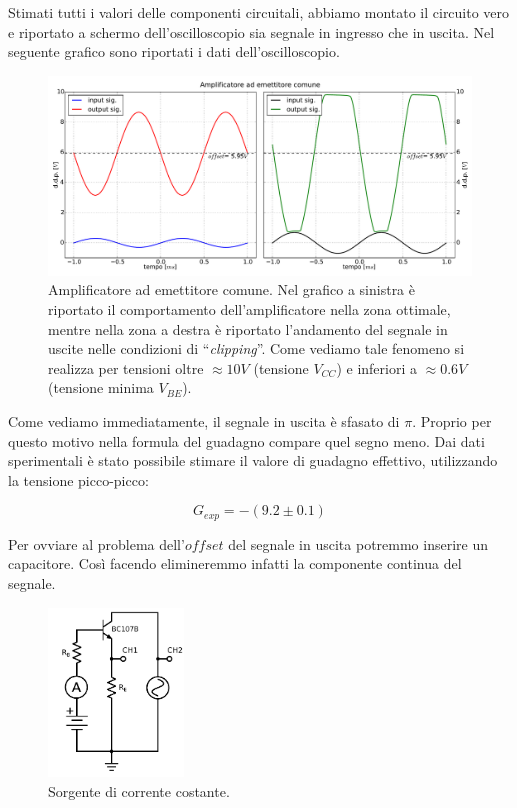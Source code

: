 Stimati tutti i valori delle componenti circuitali, abbiamo montato il circuito vero e riportato a schermo dell'oscilloscopio sia segnale in ingresso che in uscita.
Nel seguente grafico sono riportati i dati dell'oscilloscopio.

\begin{figure}[H]
\centering
	\includegraphics[scale=0.45]{amp.pdf}
	\caption{Amplificatore ad emettitore comune. Nel grafico a sinistra è riportato il comportamento dell'amplificatore nella zona ottimale, mentre nella zona a destra è riportato l'andamento del segnale in uscite nelle condizioni di ``\emph{clipping}''. Come vediamo tale fenomeno si realizza per tensioni oltre $\approx 10V$ (tensione $V_{CC}$) e inferiori a $\approx 0.6V$ (tensione minima $V_{BE}$). }
	\label{fig:amp}
\end{figure}

Come vediamo immediatamente, il segnale in uscita è sfasato di $\pi$.
Proprio per questo motivo nella formula del guadagno compare quel segno meno.
Dai dati sperimentali è stato possibile stimare il valore di guadagno effettivo, utilizzando la tensione picco-picco:

$$G_{exp}=-(9.2 \pm 0.1)$$

Per ovviare al problema dell'$offset$ del segnale in uscita potremmo inserire un capacitore. Così facendo elimineremmo infatti la componente continua del segnale. 

\begin{figure}
	\includegraphics[width=36mm]{cc3.pdf}
	\caption{Sorgente di corrente costante.}
	\label{fig:cc3}
\end{figure}

